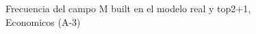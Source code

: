 \begin{figure}[H]
    \centering
    
    \caption{Frecuencia del campo M built en el modelo real y top2+1, Economicos (A-3)}
    \label{frecuency-M Built-top2+1}
\end{figure}